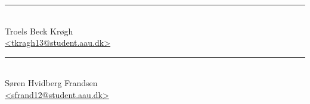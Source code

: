 \noindent
\begin{minipage}[b]{0.45\textwidth}
    \centering
    \rule{\textwidth}{0.5pt}\\
    Troels Beck Kr\o gh\\
    {\footnotesize \href{mailto:tkragh13@student.aau.dk}{<tkragh13@student.aau.dk>}}
\end{minipage}
\hfill
\begin{minipage}[b]{0.45\textwidth}
    \centering
    \rule{\textwidth}{0.5pt}\\
    S\o ren Hvidberg Frandsen\\
    {\footnotesize \href{mailto:sfrand12@student.aau.dk}{<sfrand12@student.aau.dk>}}
\end{minipage}\\